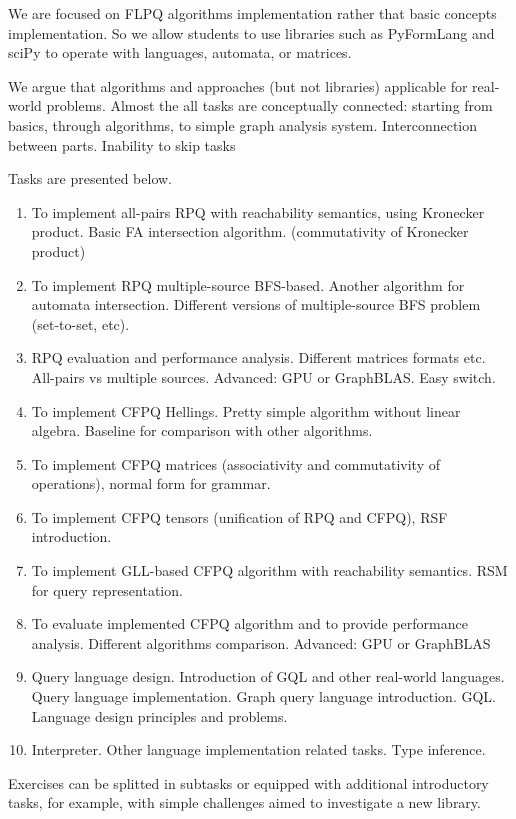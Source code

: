 \documentclass[sigconf]{acmart}
\begin{document}
We are focused on FLPQ algorithms implementation rather that basic concepts implementation.
So we allow students to use libraries such as PyFormLang and sciPy to operate with languages, automata, or matrices.

We argue that algorithms and approaches (but not libraries) applicable for real-world problems. 
Almost the all tasks are conceptually connected: starting from basics, through algorithms, to simple graph analysis system.
Interconnection between parts. 
Inability to skip tasks 

Tasks are presented below.
\begin{enumerate}
  \item To implement all-pairs RPQ with reachability semantics, using Kronecker product. Basic FA intersection algorithm. (commutativity of Kronecker product)
  \item To implement RPQ multiple-source BFS-based. Another algorithm for automata intersection. Different versions of multiple-source BFS problem (set-to-set, etc).  
  \item RPQ evaluation and performance analysis. Different matrices formats etc. All-pairs vs multiple sources. Advanced: GPU or GraphBLAS. Easy switch.
  \item To implement CFPQ Hellings. Pretty simple algorithm without linear algebra. Baseline for comparison with other algorithms. 
  \item To implement CFPQ matrices (associativity and commutativity of operations), normal form for grammar.
  \item To implement CFPQ tensors (unification of RPQ and CFPQ), RSF introduction.
  \item To implement GLL-based CFPQ algorithm with reachability semantics. RSM for query representation. 
  \item To evaluate implemented CFPQ algorithm and to provide performance analysis. Different algorithms comparison. Advanced: GPU or GraphBLAS 
  \item Query language design. Introduction of GQL and other real-world languages. Query language implementation. Graph query language introduction. GQL. Language design principles and problems.
  \item Interpreter. Other language implementation related tasks. Type inference.
\end{enumerate}

Exercises can be splitted in subtasks or equipped with additional introductory tasks, for example, with simple challenges aimed to investigate a new library.
\end{document}
